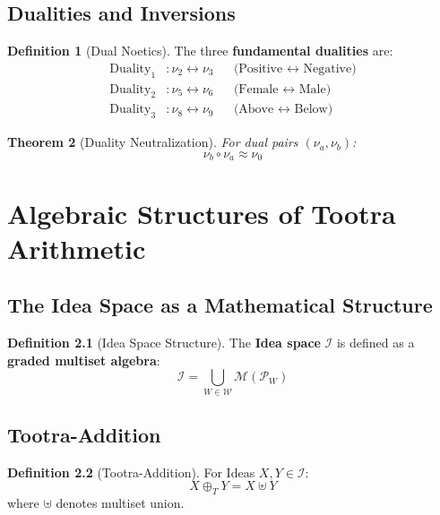 \documentclass[11pt,twoside,openright]{book}
\theoremstyle{definition}
\newtheorem{definition}{Definition}[chapter]
\theoremstyle{plain}
\newtheorem{theorem}[definition]{Theorem}
\theoremstyle{remark}
\newcommand{\Worlds}{\mathcal{W}}
\newcommand{\Ideas}{\mathcal{I}}
\newcommand{\noe}[1]{\nu_{#1}}
\newcommand{\Tadd}{\oplus_T}
\begin{document}
\section{Dualities and Inversions}

\begin{definition}[Dual Noetics]
\label{def:dual-noetics}
The three \textbf{fundamental dualities} are:
\begin{align}
\text{Duality}_1 &: \noe{2} \leftrightarrow \noe{3} && \text{(Positive } \leftrightarrow \text{ Negative)} \\
\text{Duality}_2 &: \noe{5} \leftrightarrow \noe{6} && \text{(Female } \leftrightarrow \text{ Male)} \\
\text{Duality}_3 &: \noe{8} \leftrightarrow \noe{9} && \text{(Above } \leftrightarrow \text{ Below)}
\end{align}
\end{definition}

\begin{theorem}[Duality Neutralization]
\label{thm:duality-neutral}
For dual pairs $(\noe{a}, \noe{b})$:
\[
\noe{b} \circ \noe{a} \approx \noe{0}
\]
\end{theorem}

\chapter{Algebraic Structures of Tootra Arithmetic}
\label{ch:tootra-arithmetic}

\section{The Idea Space as a Mathematical Structure}

\begin{definition}[Idea Space Structure]
\label{def:idea-structure}
The \textbf{Idea space} $\Ideas$ is defined as a \textbf{graded multiset algebra}:
\[
\Ideas = \bigcup_{W \in \Worlds} \mathcal{M}(\mathcal{P}_W)
\]
\end{definition}

\section{Tootra-Addition}

\begin{definition}[Tootra-Addition]
\label{def:tootra-add}
For Ideas $X, Y \in \Ideas$:
\[
X \Tadd Y = X \uplus Y
\]
where $\uplus$ denotes multiset union.
\end{definition}
\end{document}
